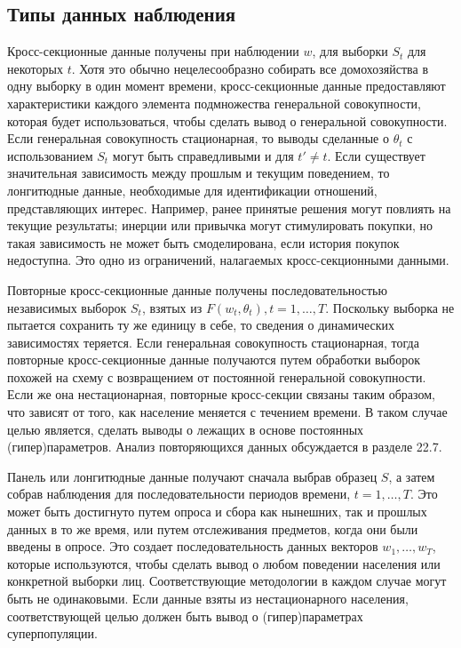 \subsection{Типы данных наблюдения}

Кросс-секционные данные получены при наблюдении $w$, для выборки $S_{t}$ для некоторых $t$. Хотя это обычно нецелесообразно собирать все домохозяйства в одну выборку в один момент времени, кросс-секционные данные предоставляют характеристики каждого элемента подмножества генеральной совокупности, которая будет использоваться, чтобы сделать вывод о генеральной совокупности. Если генеральная совокупность стационарная, то выводы сделанные о $\theta_{t}$ с использованием $S_{t}$ могут быть справедливыми и для $t'\neq t$. Если существует значительная зависимость между прошлым и текущим поведением, то лонгитюдные данные, необходимые для идентификации отношений, представляющих интерес. Например, ранее принятые решения могут повлиять на текущие результаты; инерции или привычка могут стимулировать покупки, но такая зависимость не может быть смоделирована, если история покупок недоступна. Это одно из ограничений, налагаемых кросс-секционными данными.


Повторные кросс-секционные данные получены последовательностью независимых выборок $S_{t}$, взятых из $F(w_{t},\theta_{t}), t=1,\dots,T$. Поскольку выборка не пытается сохранить ту же единицу в себе, то сведения о динамических зависимостях теряется. Если генеральная совокупность стационарная, тогда повторные кросс-секционные данные получаются путем обработки выборок похожей на схему с возвращением от постоянной генеральной совокупности. Если же она нестационарная, повторные кросс-секции связаны таким образом, что зависят от того, как население меняется с течением времени. В таком случае целью является, сделать выводы о лежащих в основе постоянных (гипер)параметров. Анализ повторяющихся данных обсуждается в разделе 22.7.


Панель или лонгитюдные данные получают сначала выбрав образец $S$, а затем собрав наблюдения для последовательности периодов времени, $t=1,\dots,T$. Это может быть достигнуто путем опроса и сбора как нынешних, так и прошлых данных в то же время, или путем отслеживания предметов, когда они были введены в опросе. Это создает последовательность данных векторов ${w_{1},\dots,w_{T}}$, которые используются, чтобы сделать вывод о любом поведении населения или конкретной выборки лиц. Соответствующие методологии в каждом случае могут быть не одинаковыми. Если данные взяты из нестационарного населения, соответствующей целью должен быть вывод о (гипер)параметрах суперпопуляции.


